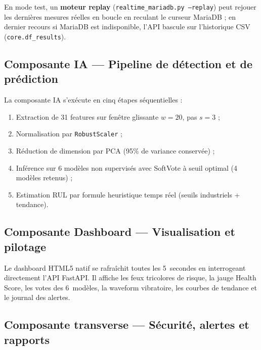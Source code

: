 \documentclass[12pt,a4paper]{report}
\begin{document}
En mode test, un \textbf{moteur replay} (\texttt{realtime\_mariadb.py --replay}) peut
rejouer les dernières mesures réelles en boucle en reculant le curseur MariaDB ; en dernier
recours si MariaDB est indisponible, l'API bascule sur l'historique CSV
(\texttt{core.df\_results}).

\subsection{Composante IA — Pipeline de détection et de prédiction}

La composante IA s'exécute en cinq étapes séquentielles :

\begin{enumerate}
  \item Extraction de 31 features sur fenêtre glissante $w=20$, pas $s=3$ ;
  \item Normalisation par \texttt{RobustScaler} ;
  \item Réduction de dimension par PCA (95\% de variance conservée) ;
  \item Inférence sur 6 modèles non supervisés avec SoftVote à seuil optimal (4 modèles retenus) ;
  \item Estimation RUL par formule heuristique temps réel (seuils industriels + tendance).
\end{enumerate}

\subsection{Composante Dashboard — Visualisation et pilotage}

Le dashboard HTML5 natif se rafraîchit toutes les 5~secondes en interrogeant directement l'API FastAPI. Il affiche les feux tricolores de risque, la jauge Health Score, les votes des 6~modèles, la waveform vibratoire, les courbes de tendance et le journal des alertes.

\subsection{Composante transverse — Sécurité, alertes et rapports}
\end{document}
